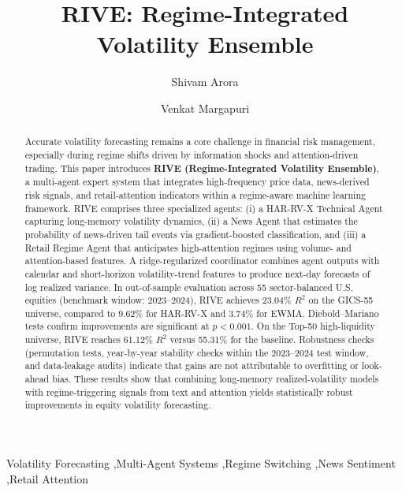 \documentclass[review]{elsarticle}
\begin{document}
\begin{frontmatter}

\title{RIVE: Regime-Integrated Volatility Ensemble}

\author[inst1]{Shivam Arora}
\author[inst1]{Venkat Margapuri}

\begin{abstract}
Accurate volatility forecasting remains a core challenge in financial risk management, especially during regime shifts driven by information shocks and attention-driven trading. This paper introduces \textbf{RIVE (Regime-Integrated Volatility Ensemble)}, a multi-agent expert system that integrates high-frequency price data, news-derived risk signals, and retail-attention indicators within a regime-aware machine learning framework. RIVE comprises three specialized agents: (i) a HAR-RV-X Technical Agent capturing long-memory volatility dynamics, (ii) a News Agent that estimates the probability of news-driven tail events via gradient-boosted classification, and (iii) a Retail Regime Agent that anticipates high-attention regimes using volume- and attention-based features. A ridge-regularized coordinator combines agent outputs with calendar and short-horizon volatility-trend features to produce next-day forecasts of log realized variance. In out-of-sample evaluation across 55 sector-balanced U.S. equities (benchmark window: 2023--2024), RIVE achieves 23.04\% $R^2$ on the GICS-55 universe, compared to 9.62\% for HAR-RV-X and 3.74\% for EWMA. %
Diebold--Mariano tests confirm improvements are significant at $p<0.001$. On the Top-50 high-liquidity universe, RIVE reaches 61.12\% $R^2$ versus 55.31\% for the baseline. Robustness checks (permutation tests, year-by-year stability checks within the 2023--2024 test window, and data-leakage audits) indicate that gains are not attributable to overfitting or look-ahead bias. %
These results show that combining long-memory realized-volatility models with regime-triggering signals from text and attention yields statistically robust improvements in equity volatility forecasting.
\end{abstract}

\begin{keyword}
Volatility Forecasting \sep Multi-Agent Systems \sep Regime Switching \sep News Sentiment \sep Retail Attention
\end{keyword}

\end{frontmatter}
\end{document}
